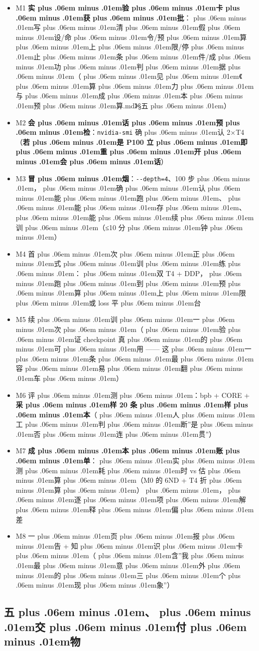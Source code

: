 \documentclass[
]{article}
\newcommand{\passthrough}[1]{#1}
\providecommand{\tightlist}{%
  \setlength{\itemsep}{0pt}\setlength{\parskip}{0pt}}
\def\zh#1{{\zhfont #1}}
\def\sym#1{{\symfont #1}}
\def\zhglue{\hskip0pt plus .06em minus .01em}
\begin{document}
\begin{itemize}
\tightlist
\item[$\square$]
  M1 \textbf{\zh{实\zhglue 验\zhglue 卡\zhglue 获\zhglue 批}}\zh{：\zhglue 写\zhglue 清\zhglue 假\zhglue 设}/\zh{命\zhglue 令}/\zh{预\zhglue 算\zhglue 上\zhglue 限}/\zh{停\zhglue 止\zhglue 条\zhglue 件}/\zh{成\zhglue 功\zhglue 判\zhglue 据\zhglue （\zhglue 见\zhglue 《\zhglue 算\zhglue 力\zhglue 与\zhglue 成\zhglue 本\zhglue 预\zhglue 算}.md\zh{》}\sym{§}\zh{五\zhglue ）}
\item[$\square$]
  M2 \textbf{\zh{会\zhglue 话\zhglue 预\zhglue 检}}\zh{：}\passthrough{\lstinline!nvidia-smi!} \zh{确\zhglue 认} 2\sym{×}T4\zh{（}\textbf{\zh{若\zhglue 是} P100 \zh{立\zhglue 即\zhglue 重\zhglue 开\zhglue 会\zhglue 话}}\zh{）}
\item[$\square$]
  M3 \textbf{\zh{冒\zhglue 烟}}\zh{：}\passthrough{\lstinline!--depth=4!}\zh{、}100 \zh{步\zhglue ，\zhglue 确\zhglue 认\zhglue 能\zhglue 跑\zhglue 、\zhglue 能\zhglue 存\zhglue 、\zhglue 能\zhglue 续\zhglue 训\zhglue （}\sym{≤}10 \zh{分\zhglue 钟\zhglue ）}
\item[$\square$]
  M4 \zh{首\zhglue 次\zhglue 正\zhglue 式\zhglue 训\zhglue 练\zhglue ：\zhglue 双} T4 + DDP\zh{，\zhglue 跑\zhglue 到\zhglue 预\zhglue 算\zhglue 上\zhglue 限\zhglue 或} loss \zh{平\zhglue 台}
\item[$\square$]
  M5 \zh{续\zhglue 训\zhglue 一\zhglue 次\zhglue （\zhglue 验\zhglue 证} checkpoint \zh{真\zhglue 的\zhglue 可\zhglue 用} ------ \zh{这\zhglue 一\zhglue 条\zhglue 最\zhglue 容\zhglue 易\zhglue 翻\zhglue 车\zhglue ）}
\item[$\square$]
  M6 \zh{评\zhglue 测\zhglue ：}bpb + CORE + \textbf{\zh{采\zhglue 样} 20 \zh{条\zhglue 样\zhglue 本}}\zh{（\zhglue 人\zhglue 工\zhglue 判\zhglue 断}''\zh{是\zhglue 否\zhglue 连\zhglue 贯}''\zh{）}
\item[$\square$]
  M7 \textbf{\zh{成\zhglue 本\zhglue 账\zhglue 单}}\zh{：\zhglue 实\zhglue 测\zhglue 耗\zhglue 时} vs \zh{估\zhglue 算\zhglue （}M0 \zh{的} 6ND + T4 \zh{折\zhglue 算\zhglue ）\zhglue ，\zhglue 逐\zhglue 项\zhglue 解\zhglue 释\zhglue 偏\zhglue 差}
\item[$\square$]
  M8 \zh{一\zhglue 页\zhglue 报\zhglue 告} + \zh{知\zhglue 识\zhglue 卡\zhglue （\zhglue 含}''\zh{我\zhglue 最\zhglue 意\zhglue 外\zhglue 的\zhglue 三\zhglue 个\zhglue 现\zhglue 象}''\zh{）}
\end{itemize}

\subsection{\zh{五\zhglue 、\zhglue 交\zhglue 付\zhglue 物}}\label{ux4e94ux4ea4ux4ed8ux7269-2}
\end{document}
